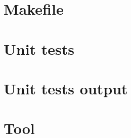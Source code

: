\section{Makefile}

\begin{scriptsize}
\begin{ttfamily}

\end{ttfamily}
\end{scriptsize}

\section{Unit tests}

\begin{scriptsize}
\begin{ttfamily}

\end{ttfamily}
\end{scriptsize}

\section{Unit tests output}

\begin{scriptsize}
\begin{ttfamily}

\end{ttfamily}
\end{scriptsize}

\section{Tool}

\begin{scriptsize}
\begin{ttfamily}

\end{ttfamily}
\end{scriptsize}

